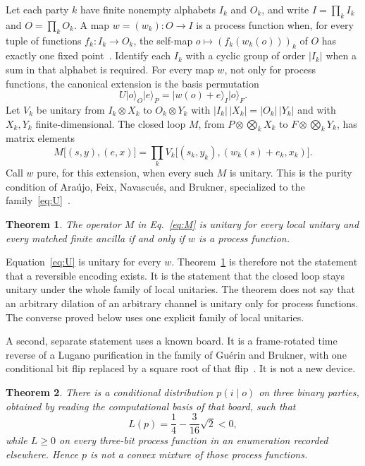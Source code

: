 \documentclass[aps,pra,reprint,amsmath,amssymb,nofootinbib]{revtex4-2}
\newtheorem{theorem}{Theorem}
\begin{document}
Let each party \(k\) have finite nonempty alphabets \(I_k\) and \(O_k\), and write \(I=\prod_k I_k\) and \(O=\prod_k O_k\). A map \(w=(w_k):O\to I\) is a process function when, for every tuple of functions \(f_k:I_k\to O_k\), the self-map \(o\mapsto(f_k(w_k(o)))_k\) of \(O\) has exactly one fixed point~\cite{baumeler2016}. Identify each \(I_k\) with a cyclic group of order \(|I_k|\) when a sum in that alphabet is required. For every map \(w\), not only for process functions, the canonical extension is the basis permutation
\begin{equation}
\label{eq:U}
U\lvert o\rangle_O\lvert e\rangle_P=\lvert w(o)+e\rangle_I\lvert o\rangle_F.
\end{equation}
Let \(V_k\) be unitary from \(I_k\otimes X_k\) to \(O_k\otimes Y_k\) with \(|I_k|\,|X_k|=|O_k|\,|Y_k|\) and with \(X_k,Y_k\) finite-dimensional. The closed loop \(M\), from \(P\otimes\bigotimes_k X_k\) to \(F\otimes\bigotimes_k Y_k\), has matrix elements
\begin{equation}
\label{eq:M}
M\bigl[(s,y),(e,x)\bigr]
=\prod_k V_k\bigl[(s_k,y_k),(w_k(s)+e_k,x_k)\bigr].
\end{equation}
Call \(w\) pure, for this extension, when every such \(M\) is unitary. This is the purity condition of Ara\'ujo, Feix, Navascu\'es, and Brukner, specialized to the family~\eqref{eq:U}~\cite{araujo2017}.

\begin{theorem}
\label{thm:iff}
The operator \(M\) in Eq.~\eqref{eq:M} is unitary for every local unitary and every matched finite ancilla if and only if \(w\) is a process function.
\end{theorem}

Equation~\eqref{eq:U} is unitary for every \(w\). Theorem~\ref{thm:iff} is therefore not the statement that a reversible encoding exists. It is the statement that the closed loop stays unitary under the whole family of local unitaries. The theorem does not say that an arbitrary dilation of an arbitrary channel is unitary only for process functions. The converse proved below uses one explicit family of local unitaries.

A second, separate statement uses a known board. It is a frame-rotated time reverse of a Lugano purification in the family of Gu\'erin and Brukner, with one conditional bit flip replaced by a square root of that flip~\cite{guerin2018}. It is not a new device.

\begin{theorem}
\label{thm:sep}
There is a conditional distribution \(p(i\mid o)\) on three binary parties, obtained by reading the computational basis of that board, such that
\begin{equation}
\label{eq:L}
L(p)=\frac14-\frac{3}{16}\sqrt{2}<0,
\end{equation}
while \(L\ge 0\) on every three-bit process function in an enumeration recorded elsewhere. Hence \(p\) is not a convex mixture of those process functions.
\end{theorem}
\end{document}
